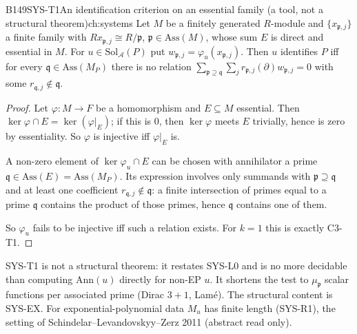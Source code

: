 \begin{dimcard}{B149}{SYS-T1}{An identification criterion on an essential family}{\pw{} (a tool, not a structural theorem)}{ch:systems}
Let $M$ be a finitely generated $R$-module and $\{x_{\mathfrak p,j}\}$ a finite family with $Rx_{\mathfrak p,j}\cong R/\mathfrak p$, $\mathfrak p\in\mathrm{Ass}(M)$, whose sum $E$ is direct and essential in $M$. For $u\in\mathrm{Sol}_{\mathcal A}(P)$ put $w_{\mathfrak p,j}=\varphi_u(x_{\mathfrak p,j})$. Then $u$ identifies $P$ iff for every $\mathfrak q\in\mathrm{Ass}(M_P)$ there is no relation $\sum_{\mathfrak p\supseteq\mathfrak q}\sum_jr_{\mathfrak p,j}(\partial)w_{\mathfrak p,j}=0$ with some $r_{\mathfrak q,j}\notin\mathfrak q$.
\end{dimcard}

\begin{proof}
Let $\varphi:M\to F$ be a homomorphism and $E\subseteq M$ essential. Then $\ker\varphi\cap E=\ker(\varphi|_E)$; if this is $0$, then $\ker\varphi$ meets $E$ trivially, hence is zero by essentiality. So $\varphi$ is injective iff $\varphi|_E$ is.

A non-zero element of $\ker\varphi_u\cap E$ can be chosen with annihilator a prime $\mathfrak q\in\mathrm{Ass}(E)=\mathrm{Ass}(M_P)$. Its expression involves only summands with $\mathfrak p\supseteq\mathfrak q$ and at least one coefficient $r_{\mathfrak q,j}\notin\mathfrak q$: a finite intersection of primes equal to a prime $\mathfrak q$ contains the product of those primes, hence $\mathfrak q$ contains one of them.

So $\varphi_u$ fails to be injective iff such a relation exists. For $k=1$ this is exactly C3-T1.

\end{proof}

\begin{caution}[title={Status and prior art}]
SYS-T1 is not a structural theorem: it restates SYS-L0 and is no more decidable than computing $\mathrm{Ann}(u)$ directly for non-EP $u$. It shortens the test to $\mu_{\mathfrak p}$ scalar functions per associated prime (Dirac $3{+}1$, Lam\'e). The structural content is SYS-EX. For exponential-polynomial data $M_u$ has finite length (SYS-R1), the setting of Schindelar--Levandovskyy--Zerz 2011 (abstract read only).
\end{caution}

